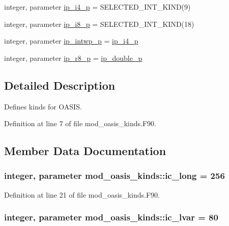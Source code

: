 \begin{DoxyCompactItemize}
\item 
integer, parameter \hyperlink{classmod__oasis__kinds_a1e3c90ad6857ff8675d3e2548d516200}{ip\+\_\+i4\+\_\+p} = S\+E\+L\+E\+C\+T\+E\+D\+\_\+\+I\+N\+T\+\_\+\+K\+I\+N\+D(9)
\item 
integer, parameter \hyperlink{classmod__oasis__kinds_a8dbd6aa926433f02df94bca462f122df}{ip\+\_\+i8\+\_\+p} = S\+E\+L\+E\+C\+T\+E\+D\+\_\+\+I\+N\+T\+\_\+\+K\+I\+N\+D(18)
\item 
integer, parameter \hyperlink{classmod__oasis__kinds_a7bf99d9ca4dbcaa5e6207e48835d2ca2}{ip\+\_\+intwp\+\_\+p} = \hyperlink{classmod__oasis__kinds_a1e3c90ad6857ff8675d3e2548d516200}{ip\+\_\+i4\+\_\+p}
\item 
integer, parameter \hyperlink{classmod__oasis__kinds_a6129e979d32b55cb020fb76068ce9808}{ip\+\_\+r8\+\_\+p} = \hyperlink{classmod__oasis__kinds_aff0b6e4604e7a60178eeca47edec1460}{ip\+\_\+double\+\_\+p}
\end{DoxyCompactItemize}


\subsection{Detailed Description}
Defines kinds for O\+A\+S\+I\+S. 

Definition at line 7 of file mod\+\_\+oasis\+\_\+kinds.\+F90.



\subsection{Member Data Documentation}
\hypertarget{classmod__oasis__kinds_ada2568a43f71f0f93c054cfd3982da57}{
\subsubsection[{ic\+\_\+long}]{\setlength{\rightskip}{0pt plus 5cm}integer, parameter mod\+\_\+oasis\+\_\+kinds\+::ic\+\_\+long = 256}}\label{classmod__oasis__kinds_ada2568a43f71f0f93c054cfd3982da57}


Definition at line 21 of file mod\+\_\+oasis\+\_\+kinds.\+F90.

\hypertarget{classmod__oasis__kinds_a5c0c2841fb9b4f7cbeb6de3f5731371a}{
\subsubsection[{ic\+\_\+lvar}]{\setlength{\rightskip}{0pt plus 5cm}integer, parameter mod\+\_\+oasis\+\_\+kinds\+::ic\+\_\+lvar = 80}}\label{classmod__oasis__kinds_a5c0c2841fb9b4f7cbeb6de3f5731371a}


